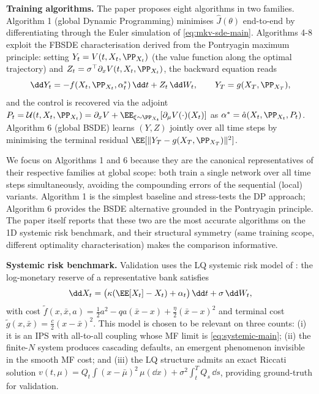 \documentclass[11pt]{article}
\begin{document}
\textbf{Training algorithms.} The paper proposes eight algorithms in two families. Algorithm 1 (global Dynamic Programming) minimises $\hat{J}(\theta)$ end-to-end by differentiating through the Euler simulation of \eqref{eq:mkv-sde-main}. Algorithms 4-8 exploit the FBSDE characterisation derived from the Pontryagin maximum principle: setting $Y_t = V(t, X_t, \PP_{X_t})$ (the value function along the optimal trajectory) and $Z_t = \sigma^\top \partial_x V(t, X_t, \PP_{X_t})$, the backward equation reads
\begin{equation}\label{eq:bsde-main}
  \dd Y_t = -f(X_t, \PP_{X_t}, \alpha^*_t)\,\dd t + Z_t\,\dd W_t, \qquad Y_T = g(X_T, \PP_{X_T}),
\end{equation}
and the control is recovered via the adjoint $P_t = \mathcal{U}(t, X_t, \PP_{X_t}) = \partial_x V + \EE_{\xi \sim \PP_{X_t}}[\partial_\mu V(\cdot)(X_t)]$ as $\alpha^* = \hat{a}(X_t, \PP_{X_t}, P_t)$. Algorithm 6 (global BSDE) learns $(Y, Z)$ jointly over all time steps by minimising the terminal residual $\EE[\|Y_T - g(X_T, \PP_{X_T})\|^2]$.

We focus on Algorithms 1 and 6 because they are the canonical representatives of their respective families at global scope: both train a single network over all time steps simultaneously, avoiding the compounding errors of the sequential (local) variants. Algorithm 1 is the simplest baseline and stress-tests the DP approach; Algorithm 6 provides the BSDE alternative grounded in the Pontryagin principle. The paper itself reports that these two are the most accurate algorithms on the 1D systemic risk benchmark, and their structural symmetry (same training scope, different optimality characterisation) makes the comparison informative.

\textbf{Systemic risk benchmark.} Validation uses the LQ systemic risk model of \citet{carmona2015systemic}: the log-monetary reserve of a representative bank satisfies
\begin{equation}\label{eq:systemic-main}
  \dd X_t = \bigl(\kappa(\EE[X_t] - X_t) + \alpha_t\bigr)\,\dd t + \sigma\,\dd W_t,
\end{equation}
with cost $\tilde{f}(x,\bar x, a) = \tfrac{1}{2}a^2 - qa(\bar x - x) + \tfrac{\eta}{2}(\bar x - x)^2$ and terminal cost $\tilde{g}(x,\bar x) = \tfrac{c}{2}(x - \bar x)^2$. This model is chosen to be relevant on three counts: (i) it is an IPS with all-to-all coupling whose MF limit is \eqref{eq:systemic-main}; (ii) the finite-$N$ system produces cascading defaults, an emergent phenomenon invisible in the smooth MF cost; and (iii) the LQ structure admits an exact Riccati solution $v(t,\mu) = Q_t \int(x-\bar\mu)^2\,\mu(\dd x) + \sigma^2\int_t^T Q_s\,\dd s$, providing ground-truth for validation.
\end{document}
